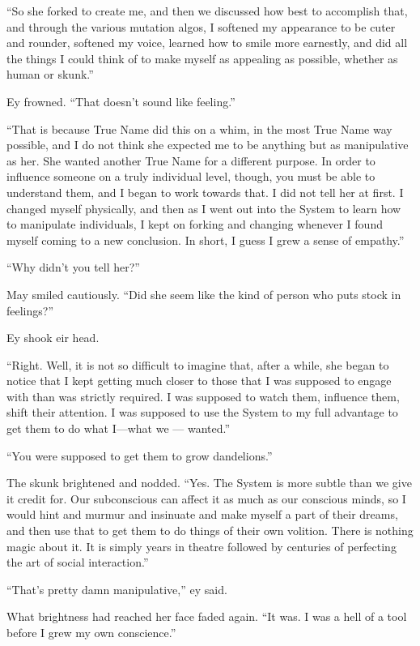 ``So she forked to create me, and then we discussed how best to accomplish that, and through the various mutation algos, I softened my appearance to be cuter and rounder, softened my voice, learned how to smile more earnestly, and did all the things I could think of to make myself as appealing as possible, whether as human or skunk.''

Ey frowned. ``That doesn't sound like feeling.''

``That is because True Name did this on a whim, in the most True Name way possible, and I do not think she expected me to be anything but as manipulative as her. She wanted another True Name for a different purpose. In order to influence someone on a truly individual level, though, you must be able to understand them, and I began to work towards that. I did not tell her at first. I changed myself physically, and then as I went out into the System to learn how to manipulate individuals, I kept on forking and changing whenever I found myself coming to a new conclusion. In short, I guess I grew a sense of empathy.''

``Why didn't you tell her?''

May smiled cautiously. ``Did she seem like the kind of person who puts stock in feelings?''

Ey shook eir head.

``Right. Well, it is not so difficult to imagine that, after a while, she began to notice that I kept getting much closer to those that I was supposed to engage with than was strictly required. I was supposed to watch them, influence them, shift their attention. I was supposed to use the System to my full advantage to get them to do what I---what we — wanted.''

``You were supposed to get them to grow dandelions.''

The skunk brightened and nodded. ``Yes. The System is more subtle than we give it credit for. Our subconscious can affect it as much as our conscious minds, so I would hint and murmur and insinuate and make myself a part of their dreams, and then use that to get them to do things of their own volition. There is nothing magic about it. It is simply years in theatre followed by centuries of perfecting the art of social interaction.''

``That's pretty damn manipulative,'' ey said.

What brightness had reached her face faded again. ``It was. I was a hell of a tool before I grew my own conscience.''

